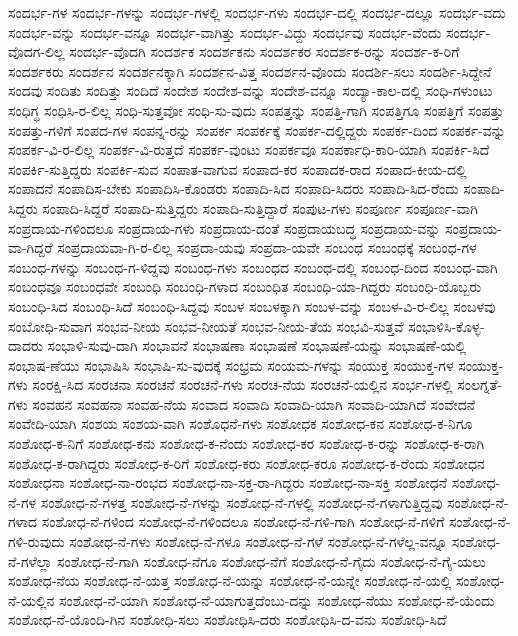 {ಸಂದರ್ಭ-ಗಳ
ಸಂದರ್ಭ-ಗಳನ್ನು
ಸಂದರ್ಭ-ಗಳಲ್ಲಿ
ಸಂದರ್ಭ-ಗಳು
ಸಂದರ್ಭ-ದಲ್ಲಿ
ಸಂದರ್ಭ-ದಲ್ಲೂ
ಸಂದರ್ಭ-ವದು
ಸಂದರ್ಭ-ವನ್ನು
ಸಂದರ್ಭ-ವನ್ನೂ
ಸಂದರ್ಭ-ವಾಗಿತ್ತು
ಸಂದರ್ಭ-ವಿದ್ದು
ಸಂದರ್ಭವು
ಸಂದರ್ಭ-ವೆಂದು
ಸಂದರ್ಭ-ವೊದಗ-ಲಿಲ್ಲ
ಸಂದರ್ಭ-ವೊದಗಿ
ಸಂದರ್ಶಕ
ಸಂದರ್ಶಕನು
ಸಂದರ್ಶಕರ
ಸಂದರ್ಶಕ-ರನ್ನು
ಸಂದರ್ಶ-ಕ-ರಿಗೆ
ಸಂದರ್ಶಕರು
ಸಂದರ್ಶನ
ಸಂದರ್ಶನಕ್ಕಾಗಿ
ಸಂದರ್ಶನ-ವಿತ್ತ
ಸಂದರ್ಶನ-ವೊಂದು
ಸಂದರ್ಶಿ-ಸಲು
ಸಂದರ್ಶಿ-ಸಿದ್ದೇನೆ
ಸಂದವು
ಸಂದಿತು
ಸಂದಿತ್ತು
ಸಂದಿದೆ
ಸಂದೇಶ
ಸಂದೇಶ-ವನ್ನು
ಸಂದೇಶ-ವನ್ನೂ
ಸಂದ್ಯಾ-ಕಾಲ-ದಲ್ಲಿ
ಸಂಧಿ-ಗಳುಂಟು
ಸಂಧಿಗ್ಧ
ಸಂಧಿಸಿ-ರ-ಲಿಲ್ಲ
ಸಂಧಿ-ಸುತ್ತವೋ
ಸಂಧಿ-ಸು-ವುದು
ಸಂಪತ್ತನ್ನು
ಸಂಪತ್ತಿ-ಗಾಗಿ
ಸಂಪತ್ತಿಗೂ
ಸಂಪತ್ತಿಗೆ
ಸಂಪತ್ತು
ಸಂಪತ್ತು-ಗಳಿಗೆ
ಸಂಪದ-ಗಳ
ಸಂಪನ್ನ-ರನ್ನು
ಸಂಪರ್ಕ
ಸಂಪರ್ಕಕ್ಕೆ
ಸಂಪರ್ಕ-ದಲ್ಲಿದ್ದರು
ಸಂಪರ್ಕ-ದಿಂದ
ಸಂಪರ್ಕ-ವನ್ನು
ಸಂಪರ್ಕ-ವಿ-ರ-ಲಿಲ್ಲ
ಸಂಪರ್ಕ-ವಿ-ರುತ್ತದೆ
ಸಂಪರ್ಕ-ವುಂಟು
ಸಂಪರ್ಕವೂ
ಸಂಪರ್ಕಾಧಿ-ಕಾರಿ-ಯಾಗಿ
ಸಂಪರ್ಕಿ-ಸಿದೆ
ಸಂಪರ್ಕಿ-ಸುತ್ತಿದ್ದರು
ಸಂಪರ್ಕಿ-ಸುವ
ಸಂಪಾತ-ವಾಗುವ
ಸಂಪಾದ-ಕರ
ಸಂಪಾದಕ-ರಾದ
ಸಂಪಾದ-ಕೀಯ-ದಲ್ಲಿ
ಸಂಪಾದನೆ
ಸಂಪಾದಿಸ-ಬೇಕು
ಸಂಪಾದಿಸಿ-ಕೊಂಡರು
ಸಂಪಾದಿ-ಸಿದ
ಸಂಪಾದಿ-ಸಿದರು
ಸಂಪಾದಿ-ಸಿದ-ರೆಂದು
ಸಂಪಾದಿ-ಸಿದ್ದರು
ಸಂಪಾದಿ-ಸಿದ್ದರೆ
ಸಂಪಾದಿ-ಸುತ್ತಿದ್ದರು
ಸಂಪಾದಿ-ಸುತ್ತಿದ್ದಾರೆ
ಸಂಪುಟ-ಗಳು
ಸಂಪೂರ್ಣ
ಸಂಪೂರ್ಣ-ವಾಗಿ
ಸಂಪ್ರದಾಯ-ಗಳಿಂದಲೂ
ಸಂಪ್ರದಾಯ-ಗಳು
ಸಂಪ್ರದಾಯ-ದಂತೆ
ಸಂಪ್ರದಾಯಬದ್ಧ
ಸಂಪ್ರದಾಯ-ವನ್ನು
ಸಂಪ್ರದಾಯ-ವಾ-ಗಿದ್ದರೆ
ಸಂಪ್ರದಾಯವಾ-ಗಿ-ರ-ಲಿಲ್ಲ
ಸಂಪ್ರದಾ-ಯವು
ಸಂಪ್ರದಾ-ಯವೇ
ಸಂಬಂಧ
ಸಂಬಂಧಕ್ಕೆ
ಸಂಬಂಧ-ಗಳ
ಸಂಬಂಧ-ಗಳನ್ನು
ಸಂಬಂಧ-ಗ-ಳಿದ್ದವು
ಸಂಬಂಧ-ಗಳು
ಸಂಬಂಧದ
ಸಂಬಂಧ-ದಲ್ಲಿ
ಸಂಬಂಧ-ದಿಂದ
ಸಂಬಂಧ-ವಾಗಿ
ಸಂಬಂಧವೂ
ಸಂಬಂಧವೇ
ಸಂಬಂಧಿ
ಸಂಬಂಧಿ-ಗಳಾದ
ಸಂಬಂಧಿತ
ಸಂಬಂಧಿ-ಯಾ-ಗಿದ್ದರು
ಸಂಬಂಧಿ-ಯೊಬ್ಬರು
ಸಂಬಂಧಿ-ಸಿದ
ಸಂಬಂಧಿ-ಸಿದೆ
ಸಂಬಂಧಿ-ಸಿದ್ದವು
ಸಂಬಳ
ಸಂಬಳಕ್ಕಾಗಿ
ಸಂಬಳ-ವನ್ನು
ಸಂಬಳ-ವಿ-ರ-ಲಿಲ್ಲ
ಸಂಬಳವು
ಸಂಬೋಧಿ-ಸುವಾಗ
ಸಂಭವ-ನೀಯ
ಸಂಭವ-ನೀಯತೆ
ಸಂಭವ-ನೀಯ-ತೆಯ
ಸಂಭವಿ-ಸುತ್ತವೆ
ಸಂಭಾಳಿಸಿ-ಕೊಳ್ಳ-ದಾದರು
ಸಂಭಾಳಿ-ಸುವು-ದಾಗಿ
ಸಂಭಾವನೆ
ಸಂಭಾಷಣಾ
ಸಂಭಾಷಣೆ
ಸಂಭಾಷಣೆ-ಯನ್ನು
ಸಂಭಾಷಣೆ-ಯಲ್ಲಿ
ಸಂಭಾಷ-ಣೆಯು
ಸಂಭಾಷಿಸಿ
ಸಂಭಾಷಿ-ಸು-ವುದಕ್ಕೆ
ಸಂಭ್ರಮ
ಸಂಯಮ-ಗಳನ್ನು
ಸಂಯುಕ್ತ
ಸಂಯುಕ್ತ-ಗಳ
ಸಂಯುಕ್ತ-ಗಳು
ಸಂರಕ್ಷಿ-ಸಿದ
ಸಂರಚನಾ
ಸಂರಚನೆ
ಸಂರಚನೆ-ಗಳು
ಸಂರಚ-ನೆಯ
ಸಂರಚನೆ-ಯಲ್ಲಿನ
ಸಂರ್ಭ-ಗಳಲ್ಲಿ
ಸಂಲಗ್ನತೆ-ಗಳು
ಸಂವಹನ
ಸಂವಹನಾ
ಸಂವಹ-ನೆಯ
ಸಂವಾದ
ಸಂವಾದಿ
ಸಂವಾದಿ-ಯಾಗಿ
ಸಂವಾದಿ-ಯಾಗಿದೆ
ಸಂವೇದನೆ
ಸಂವೇದಿ-ಯಾಗಿ
ಸಂಶಯ
ಸಂಶಯ-ವಾಗಿ
ಸಂಶೊಧನೆ-ಗಳು
ಸಂಶೋಧಕ
ಸಂಶೋಧ-ಕನ
ಸಂಶೋಧ-ಕ-ನಿಗೂ
ಸಂಶೋಧ-ಕ-ನಿಗೆ
ಸಂಶೋಧ-ಕನು
ಸಂಶೋಧ-ಕ-ನೆಂದು
ಸಂಶೋಧ-ಕರ
ಸಂಶೋಧ-ಕ-ರನ್ನು
ಸಂಶೋಧ-ಕ-ರಾಗಿ
ಸಂಶೋಧ-ಕ-ರಾಗಿದ್ದರು
ಸಂಶೋಧ-ಕ-ರಿಗೆ
ಸಂಶೋಧ-ಕರು
ಸಂಶೋಧ-ಕರೂ
ಸಂಶೋಧ-ಕ-ರೆಂದು
ಸಂಶೋಧನ
ಸಂಶೋಧನಾ
ಸಂಶೋಧ-ನಾ-ರಂಭದ
ಸಂಶೋಧ-ನಾ-ಸಕ್ತ-ರಾ-ಗಿದ್ದರು
ಸಂಶೋಧ-ನಾ-ಸಕ್ತಿ
ಸಂಶೋಧನೆ
ಸಂಶೋಧ-ನೆ-ಗಳ
ಸಂಶೋಧ-ನೆ-ಗಳತ್ತ
ಸಂಶೋಧ-ನೆ-ಗಳನ್ನು
ಸಂಶೋಧ-ನೆ-ಗಳಲ್ಲಿ
ಸಂಶೋಧ-ನೆ-ಗಳಾಗುತ್ತಿದ್ದವು
ಸಂಶೋಧ-ನೆ-ಗಳಾದ
ಸಂಶೋಧ-ನೆ-ಗಳಿಂದ
ಸಂಶೋಧ-ನೆ-ಗಳಿಂದಲೂ
ಸಂಶೋಧ-ನೆ-ಗಳಿ-ಗಾಗಿ
ಸಂಶೋಧ-ನೆ-ಗಳಿಗೆ
ಸಂಶೋಧ-ನೆ-ಗಳಿ-ರುವುದು
ಸಂಶೋಧ-ನೆ-ಗಳು
ಸಂಶೋಧ-ನೆ-ಗಳೂ
ಸಂಶೋಧ-ನೆ-ಗಳೆ
ಸಂಶೋಧ-ನೆ-ಗಳೆಲ್ಲ-ವನ್ನೂ
ಸಂಶೋಧ-ನೆ-ಗಳೆಲ್ಲಾ
ಸಂಶೋಧ-ನೆ-ಗಾಗಿ
ಸಂಶೋಧ-ನೆಗೂ
ಸಂಶೋಧ-ನೆಗೆ
ಸಂಶೋಧ-ನೆ-ಗೈದು
ಸಂಶೋಧ-ನೆ-ಗೈ-ಯಲು
ಸಂಶೋಧ-ನೆಯ
ಸಂಶೋಧ-ನೆ-ಯತ್ತ
ಸಂಶೋಧ-ನೆ-ಯನ್ನು
ಸಂಶೋಧ-ನೆ-ಯನ್ನೇ
ಸಂಶೋಧ-ನೆ-ಯಲ್ಲಿ
ಸಂಶೋಧ-ನೆ-ಯಲ್ಲಿನ
ಸಂಶೋಧ-ನೆ-ಯಾಗಿ
ಸಂಶೋಧ-ನೆ-ಯಾಗುತ್ತದೆಂಬು-ದನ್ನು
ಸಂಶೋಧ-ನೆಯು
ಸಂಶೋಧ-ನೆ-ಯೆಂದು
ಸಂಶೋಧ-ನೆ-ಯೊಂದಿ-ಗಿನ
ಸಂಶೋಧಿ-ಸಲು
ಸಂಶೋಧಿಸಿ-ದರು
ಸಂಶೋಧಿಸಿ-ದ-ವನು
ಸಂಶೋಧಿ-ಸಿದೆ
}
